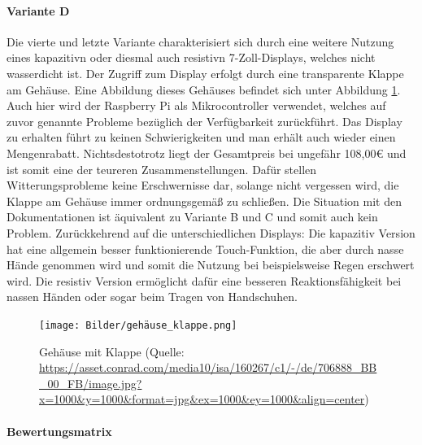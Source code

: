 \paragraph{Variante D}
Die vierte und letzte Variante charakterisiert sich durch eine weitere Nutzung eines \gls{kapazitiv}n oder diesmal auch \gls{resistiv}n 7-Zoll-Displays, welches nicht wasserdicht ist. Der Zugriff zum Display erfolgt durch eine transparente Klappe am Gehäuse. Eine Abbildung dieses Gehäuses befindet sich unter Abbildung \ref{fig:gehäuse_mit_klappe}. Auch hier wird der Raspberry Pi als Mikrocontroller verwendet, welches auf zuvor genannte Probleme bezüglich der Verfügbarkeit zurückführt. Das Display zu erhalten führt zu keinen Schwierigkeiten und man erhält auch wieder einen Mengenrabatt. Nichtsdestotrotz liegt der Gesamtpreis bei ungefähr 108,00€ und ist somit eine der teureren Zusammenstellungen. Dafür stellen Witterungsprobleme keine Erschwernisse dar, solange nicht vergessen wird, die Klappe am Gehäuse immer ordnungsgemäß zu schließen. Die Situation mit den Dokumentationen ist äquivalent zu Variante B und C und somit auch kein Problem. Zurückkehrend auf die unterschiedlichen Displays: Die \gls{kapazitiv} Version hat eine allgemein besser funktionierende Touch-Funktion, die aber durch nasse Hände genommen wird und somit die Nutzung bei beispielsweise Regen erschwert wird. Die \gls{resistiv} Version ermöglicht dafür eine besseren Reaktionsfähigkeit bei nassen Händen oder sogar beim Tragen von Handschuhen.
\begin{figure}[ht]
	\centering
	\texttt{[image: Bilder/gehäuse\_klappe.png]}
	\caption{Gehäuse mit Klappe (Quelle: \url{https://asset.conrad.com/media10/isa/160267/c1/-/de/706888_BB_00_FB/image.jpg?x=1000&y=1000&format=jpg&ex=1000&ey=1000&align=center})}
	\label{fig:gehäuse_mit_klappe}
\end{figure}
\newpage
\paragraph{Bewertungsmatrix}

